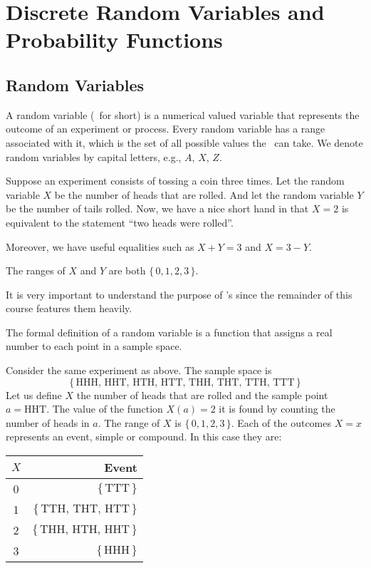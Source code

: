 \chapter{Discrete Random Variables and Probability Functions}
\section{Random Variables}
A random variable (\rv~for short) is a numerical valued variable that represents the outcome of an experiment or process. Every random variable has a range associated with it, which is the set of all possible values the \rv~can take. We denote random variables by capital letters, e.g., $A$, $X$, $Z$.
\begin{example}
Suppose an experiment consists of tossing a coin three times. Let the random variable $X$ be the number of heads that are rolled. And let the random variable $Y$ be the number of tails rolled. Now, we have a nice short hand in that $X = 2$ is equivalent to the statement ``two heads were rolled''.
\par\smallskip
Moreover, we have useful equalities such as $X + Y = 3$ and $X = 3 - Y$. 

The ranges of $X$ and $Y$ are both $\{\, 0,1,2,3 \,\}$.
\end{example}
\begin{info}
It is very important to understand the purpose of \rv's since the remainder of this course features them heavily.
\end{info}
The formal definition of a random variable is a function that assigns a real number to each point in a sample space.
\begin{example}
Consider the same experiment as above. The sample space is
\[
    \{\, \text{HHH, HHT, HTH, HTT, THH, THT, TTH, TTT} \,\}
\]
Let us define $X$ the number of heads that are rolled and the sample point $a = \text{HHT}$. The value of the function $X(a) = 2$ it is found by counting the number of heads in $a$. The range of $X$ is $\{\, 0,1,2,3 \,\}$. Each of the outcomes $X=x$ represents an event, simple or compound. In this case they are:
\begin{center}
\begin{tabular}{c|r}
    $X$     & Event \\
    \hline
    0       & $\{\, \text{TTT} \,\}$ \\
    1       & $\{\, \text{TTH, THT, HTT} \,\}$ \\
    2       & $\{\, \text{THH, HTH, HHT} \,\}$ \\
    3       & $\{\, \text{HHH} \,\}$ \\
\end{tabular}
\end{center}
\end{example}
